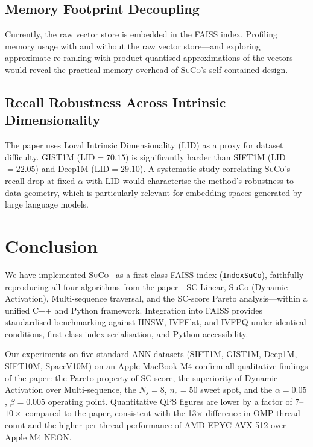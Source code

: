 \documentclass[11pt,a4paper]{article}
\newcommand{\suco}{\textsc{SuCo}}
\newcommand{\NS}{N_s}
\newcommand{\nc}{n_c}
\begin{document}
\subsection{Memory Footprint Decoupling}

Currently, the raw vector store is embedded in the FAISS index.  Profiling
memory usage with and without the raw vector store---and exploring
approximate re-ranking with product-quantised approximations of the
vectors---would reveal the practical memory overhead of \suco{}'s
self-contained design.

\subsection{Recall Robustness Across Intrinsic Dimensionality}

The paper uses Local Intrinsic Dimensionality (LID) as a proxy for dataset
difficulty.  GIST1M (LID$=70.15$) is significantly harder than SIFT1M
(LID$=22.05$) and Deep1M (LID$=29.10$).  A systematic study correlating
\suco{}'s recall drop at fixed $\alpha$ with LID would characterise the
method's robustness to data geometry, which is particularly relevant for
embedding spaces generated by large language models.

\section{Conclusion}

We have implemented \suco{}~\cite{wei2025suco} as a first-class FAISS index
(\texttt{IndexSuCo}), faithfully reproducing all four algorithms from the
paper---SC-Linear, SuCo (Dynamic Activation), Multi-sequence traversal, and
the SC-score Pareto analysis---within a unified C++ and Python framework.
Integration into FAISS provides standardised benchmarking against HNSW,
IVFFlat, and IVFPQ under identical conditions, first-class index serialisation,
and Python accessibility.

Our experiments on five standard ANN datasets (SIFT1M, GIST1M, Deep1M,
SIFT10M, SpaceV10M) on an Apple MacBook M4 confirm all qualitative findings
of the paper: the Pareto property of SC-score, the superiority of Dynamic
Activation over Multi-sequence, the $\NS = 8$, $\nc = 50$ sweet spot, and the
$\alpha = 0.05$, $\beta = 0.005$ operating point.  Quantitative QPS figures
are lower by a factor of $7$--$10\times$ compared to the paper, consistent
with the 13$\times$ difference in OMP thread count and the higher per-thread
performance of AMD EPYC AVX-512 over Apple M4 NEON.
\end{document}
